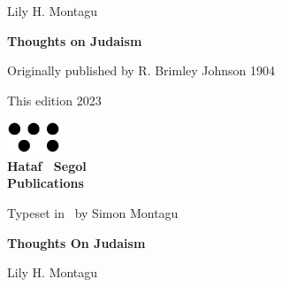 \frontmatter
\pagestyle{empty}

\vspace*{2\baselineskip}
\begin{center}
  Lily H. Montagu

  \vspace*{2\baselineskip}
  \textbf{Thoughts on Judaism}
\end{center}

\clearpage

\begin{center}
  \vspace{2\baselineskip}
  
  \small Originally published by R. Brimley Johnson 1904

  This edition 2023
  \vspace*{22\baselineskip}

  \includegraphics[width=16mm]{hatafSegolLogoNoText.png}\\
  
  {
    \Large\bfseries Hataf \ Segol\\Publications
  }

  \vspace{1\baselineskip}
  \small
  Typeset in \XeLaTeX\ by Simon Montagu
  \end{center}

\clearpage
 
{
  \vspace*{4\baselineskip}

  \centering\LARGE\bfseries Thoughts On Judaism

  \vspace{2\baselineskip}

  \Large Lily H. Montagu
  
}

\cleardoublepage
\tableofcontents*
